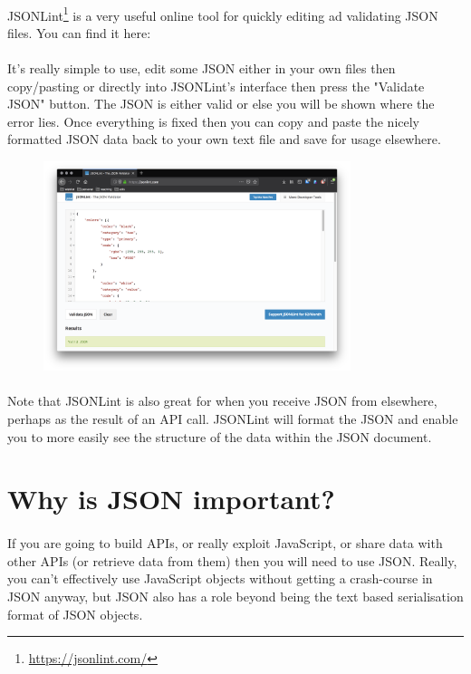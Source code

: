 \paragraph{} JSONLint\footnote{\url{https://jsonlint.com/}} is a very useful online tool for quickly editing ad validating JSON files. You can find it here:	
\paragraph{} It's really simple to use, edit some JSON either in your own files then copy/pasting or directly into JSONLint's interface then press the "Validate JSON" button. The JSON is either valid or else you will be shown where the error lies. Once everything is fixed then you can copy and paste the nicely formatted JSON data back to your own text file and save for usage elsewhere.

\begin{figure}[H]
\centering
\includegraphics[width=0.8\textwidth]{figures/jsonlint}
\label{fig:jsonlint}
\caption{}
\end{figure}

\paragraph{} Note that JSONLint is also great for when you receive JSON from elsewhere, perhaps as the result of an API call. JSONLint will format the JSON and enable you to more easily see the structure of the data within the JSON document.


\section{Why is JSON important?}
\paragraph{} If you are going to build APIs, or really exploit JavaScript, or share data with other APIs (or retrieve data from them) then you will need to use JSON. Really, you can't effectively use JavaScript objects without getting a crash-course in JSON anyway, but JSON also has a role beyond being the text based serialisation format of JSON objects.
